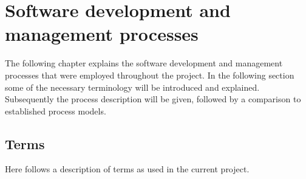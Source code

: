 \chapter{Software development and management processes}
The following chapter explains the software development and management processes that were employed throughout the project. In the following section some of the necessary terminology will be introduced and explained. Subsequently the process description will be given, followed by a comparison to established process models. %

\section{Terms}
Here follows a description of terms as used in the current project.

